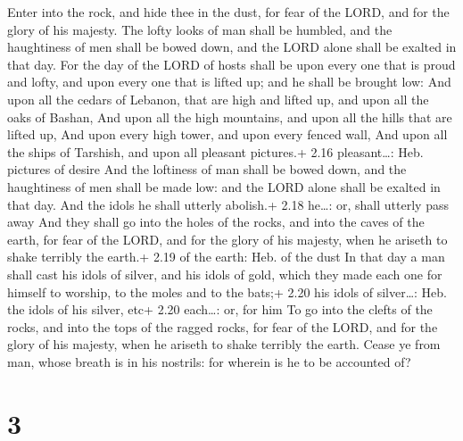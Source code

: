  Enter into the rock, and hide thee in the dust, for fear
of the LORD, and for the glory of his majesty.  The lofty
looks of man shall be humbled, and the haughtiness of men shall be bowed
down, and the LORD alone shall be exalted in that day.  For
the day of the LORD of hosts shall be upon every one that is proud and
lofty, and upon every one that is lifted up; and he shall be brought
low:  And upon all the cedars of Lebanon, that are high and
lifted up, and upon all the oaks of Bashan,  And upon all
the high mountains, and upon all the hills that are lifted up,
 And upon every high tower, and upon every fenced wall,
 And upon all the ships of Tarshish, and upon all pleasant
pictures.+ 2.16 pleasant\ldots: Heb. pictures of desire 
And the loftiness of man shall be bowed down, and the haughtiness of men
shall be made low: and the LORD alone shall be exalted in that day.
 And the idols he shall utterly abolish.+ 2.18 he\ldots:
or, shall utterly pass away  And they shall go into the
holes of the rocks, and into the caves of the earth, for fear of the
LORD, and for the glory of his majesty, when he ariseth to shake
terribly the earth.+ 2.19 of the earth: Heb. of the dust 
In that day a man shall cast his idols of silver, and his idols of gold,
which they made each one for himself to worship, to the moles and to the
bats;+ 2.20 his idols of silver\ldots: Heb. the idols of his silver,
etc+ 2.20 each\ldots: or, for him  To go into the clefts of
the rocks, and into the tops of the ragged rocks, for fear of the LORD,
and for the glory of his majesty, when he ariseth to shake terribly the
earth.  Cease ye from man, whose breath is in his nostrils:
for wherein is he to be accounted of?

\hypertarget{section-2}{%
\section{3}\label{section-2}}


